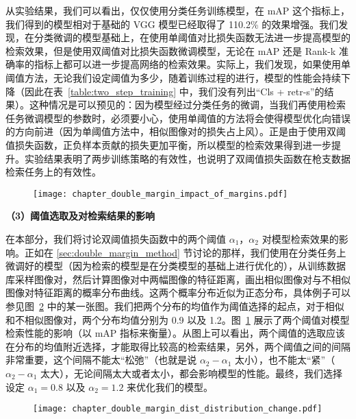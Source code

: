 从实验结果，我们可以看出，仅仅使用分类任务训练模型，在 mAP 这个指标上，我们得到的模型相对于基础的 VGG 模型已经取得了 110.2\% 的效果增强。我们发现，在分类微调的模型基础上，在使用单阈值对比损失函数无法进一步提高模型的检索效果，但是使用双阈值对比损失函数微调模型，无论在 mAP 还是 Rank-k 准确率的指标上都可以进一步提高网络的检索效果。实际上，我们发现，如果使用单阈值方法，无论我们设定阈值为多少，随着训练过程的进行，模型的性能会持续下降（因此在表~\ref{table:two_step_training} 中，我们没有列出“Cls + retr-s”的结果）。这种情况是可以预见的：因为模型经过分类任务的微调，当我们再使用检索任务微调模型的参数时，必须要小心，使用单阈值的方法将会使得模型优化向错误的方向前进（因为单阈值方法中，相似图像对的损失占上风）。正是由于使用双阈值损失函数，正负样本贡献的损失更加平衡，所以模型的检索效果得到进一步提升。实验结果表明了两步训练策略的有效性，也说明了双阈值损失函数在枪支数据检索任务上的有效性。

\begin{figure}[t]
	\centering
	\texttt{[image: chapter\_double\_margin\_impact\_of\_margins.pdf]}
	\label{fig:impact_of_margins}
\end{figure}

\noindent \textbf{（3）阈值选取及对检索结果的影响}

在本部分，我们将讨论双阈值损失函数中的两个阈值 $\alpha_1$，$\alpha_2$ 对模型检索效果的影响。正如在 \ref{sec:double_margin_method} 节讨论的那样，我们使用在分类任务上微调好的模型（因为检索的模型是在分类模型的基础上进行优化的），从训练数据库采样图像对，然后计算图像对中两幅图像的特征距离，画出相似图像对与不相似图像对特征距离的概率分布曲线。这两个概率分布近似为正态分布，具体例子可以参见图~\ref{fig:feat_dist_distribution_change} 中的某一张图。我们把两个分布的均值作为阈值选择的起点，对于相似和不相似图像对，两个分布均值分别为 0.9 以及 1.2。图~\ref{fig:impact_of_margins} 展示了两个阈值对模型检索性能的影响（以 mAP 指标来衡量）。从图上可以看出，两个阈值的选取应该在分布的均值附近选择，才能取得比较高的检索结果，另外，两个阈值之间的间隔非常重要，这个间隔不能太“松弛”（也就是说 $\alpha_2 - \alpha_1$ 太小），也不能太“紧”（$\alpha_2 - \alpha_1$ 太大），无论间隔太大或者太小，都会影响模型的性能。最终，我们选择设定 $\alpha_1=0.8$ 以及 $\alpha_2=1.2$ 来优化我们的模型。

\begin{figure}[t]
	\centering
	\texttt{[image: chapter\_double\_margin\_dist\_distribution\_change.pdf]}
	\label{fig:feat_dist_distribution_change}
\end{figure}

